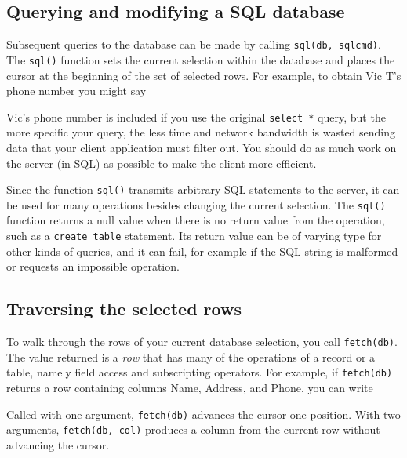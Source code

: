 \subsection{Querying and modifying a SQL database}

Subsequent queries to the database can be made by calling
\texttt{sql(db, sqlcmd)}. The \texttt{sql()} function sets
the current selection within the database and places the cursor at the
beginning of the set of selected rows. For example, to obtain Vic
T's phone number you might say


Vic's phone number is included if you use the original
\texttt{select *} query, but the more specific your query, the less
time and network bandwidth is wasted sending data that your client
application must filter out. You should do as much work on the server
(in SQL) as possible to make the client more efficient.

Since the function \texttt{sql()} transmits arbitrary SQL statements to
the server, it can be used for many operations besides changing the
current selection. The \texttt{sql()} function returns a null value
when there is no return value from the operation, such as a
\texttt{create table} statement. Its return value can be of varying
type for other kinds of queries, and it can fail, for example if the
SQL string is malformed or requests an impossible operation.

\subsection{Traversing the selected rows}

To walk through the rows of your current database selection, you call
\texttt{fetch(db)}. The value returned is a
\textit{row} that has many of the operations of a record or a table,
namely field access and subscripting operators. For example, if
\texttt{fetch(db)} returns a row containing columns Name, Address, and
Phone, you can write


\noindent
Called with one argument, \texttt{fetch(db)} advances the cursor
one position. With two arguments, \texttt{fetch(db, col)} produces a
column from the current row without advancing the cursor.

